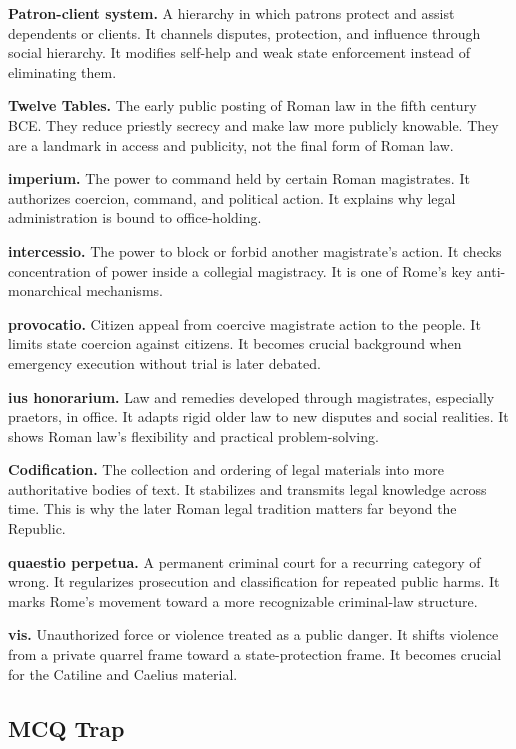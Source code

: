 \documentclass[11pt]{article}
\begin{document}
\textbf{Patron-client system.} A hierarchy in which patrons protect and assist dependents or clients. It channels disputes, protection, and influence through social hierarchy. It modifies self-help and weak state enforcement instead of eliminating them.

\textbf{Twelve Tables.} The early public posting of Roman law in the fifth century BCE. They reduce priestly secrecy and make law more publicly knowable. They are a landmark in access and publicity, not the final form of Roman law.

\textbf{imperium.} The power to command held by certain Roman magistrates. It authorizes coercion, command, and political action. It explains why legal administration is bound to office-holding.

\textbf{intercessio.} The power to block or forbid another magistrate's action. It checks concentration of power inside a collegial magistracy. It is one of Rome's key anti-monarchical mechanisms.

\textbf{provocatio.} Citizen appeal from coercive magistrate action to the people. It limits state coercion against citizens. It becomes crucial background when emergency execution without trial is later debated.

\textbf{ius honorarium.} Law and remedies developed through magistrates, especially praetors, in office. It adapts rigid older law to new disputes and social realities. It shows Roman law's flexibility and practical problem-solving.

\textbf{Codification.} The collection and ordering of legal materials into more authoritative bodies of text. It stabilizes and transmits legal knowledge across time. This is why the later Roman legal tradition matters far beyond the Republic.

\textbf{quaestio perpetua.} A permanent criminal court for a recurring category of wrong. It regularizes prosecution and classification for repeated public harms. It marks Rome's movement toward a more recognizable criminal-law structure.

\textbf{vis.} Unauthorized force or violence treated as a public danger. It shifts violence from a private quarrel frame toward a state-protection frame. It becomes crucial for the Catiline and Caelius material.

\subsection{MCQ Trap}
\end{document}
